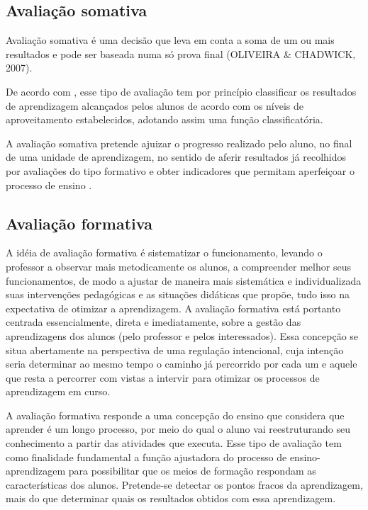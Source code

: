 \documentclass[
	12pt,				%
	openright,			%
	oneside,
	a4paper,			%
	english,			%
	french,				%
	spanish,			%
	brazil,				%
	]{abntex2}
\begin{document}
\subsection{Avaliação somativa}
\label{sec:AvaSom}
Avaliação somativa é uma decisão que leva em conta a soma de um ou mais resultados e pode ser baseada numa só prova final {\color{red}(OLIVEIRA & CHADWICK, 2007)}.

De acordo com , esse tipo de avaliação tem por princípio classificar os resultados de aprendizagem alcançados pelos alunos de acordo com os níveis de aproveitamento estabelecidos, adotando assim uma função classificatória.

A avaliação somativa pretende ajuizar o progresso realizado pelo aluno, no final de uma unidade de aprendizagem, no sentido de aferir resultados já recolhidos por avaliações do tipo formativo e obter indicadores que permitam aperfeiçoar o processo de ensino \cite{kraemer2005avaliaccao}.

\subsection{Avaliação formativa}
\label{sec:AvaFor}
A idéia de avaliação formativa é sistematizar o funcionamento, levando o professor a
observar mais metodicamente os alunos, a compreender melhor seus funcionamentos, de modo
a ajustar de maneira mais sistemática e individualizada suas intervenções pedagógicas e as
situações didáticas que propõe, tudo isso na expectativa de otimizar a aprendizagem. A
avaliação formativa está portanto centrada essencialmente, direta e imediatamente, sobre a gestão das aprendizagens dos alunos (pelo professor e pelos interessados). Essa concepção se situa abertamente na perspectiva de uma regulação intencional, cuja intenção seria determinar ao mesmo tempo o caminho já percorrido por cada um e aquele que resta a percorrer com vistas a intervir para otimizar os processos de aprendizagem em curso. \cite{perrenoud1999avaliaccao}

A avaliação formativa responde a uma concepção do ensino que considera que aprender é um longo processo, por meio do qual o aluno vai reestruturando seu conhecimento a partir das atividades que executa. Esse tipo de avaliação tem como finalidade fundamental a função ajustadora do processo de ensino-aprendizagem para possibilitar que os meios de formação respondam as características dos alunos. Pretende-se detectar os pontos fracos da aprendizagem, mais do que determinar quais os resultados obtidos com essa aprendizagem. \cite{jorba2003funccao}
\end{document}
